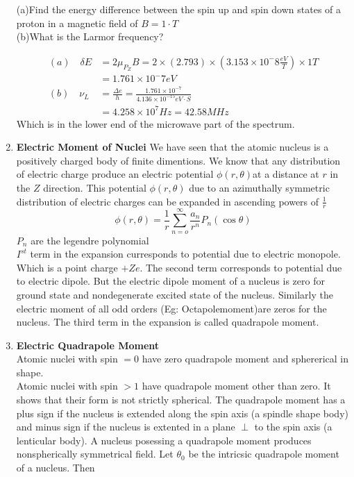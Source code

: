 \begin{enumerate}
\begin{note}
\end{note}
\begin{exercise}
	 (a)\quad Find the energy difference between the spin up and spin down states of a proton in a magnetic field of $B=1\cdot T$ \\
	(b)\quad What is the Larmor frequency?
\end{exercise}
\begin{answer}
	\begin{align*}
	(a)\quad
	\delta E&=2\mu_{P_{Z}}B=2\times(2.793)\times \left(3.153\times10^-8\frac{eV}{T} \right) \times1T\\
	&=1.761\times10^-7 eV\\
	(b)\quad \nu_{L}&=\frac{\Delta e}{h}=\frac{1.761\times10^{-7}}{4.136\times10^{-15}eV\cdot S}\\
	&=4.258\times10^7Hz=42.58MHz
	\end{align*}
	Which is in the lower end of the microwave part of the spectrum.
\end{answer}
\item \textbf{Electric Moment of Nuclei}
We have seen that the atomic nucleus is a positively charged body of finite dimentions. We know that any distribution of electric charge produce an electric potential $\phi(r,\theta)$at a distance at $r$ in the $Z$ direction. This potential $\phi(r,\theta)$ due to an azimuthally symmetric distribution of electric charges can be expanded in ascending powers of $\frac{1}{r}$
$$\phi(r,\theta)=\frac{1}{r}\sum_{n=o}^{\infty}\frac{a_n}{r^n}P_n(\cos\theta)$$
$P_n$ are the legendre polynomial\\
$I^{st}$ term in the expansion curresponds to potential due to electric monopole. Which is a point charge $+Ze$. The second term corresponds to potential due to electric dipole. But the electric dipole moment of a nucleus is zero for ground state and nondegenerate excited state of the nucleus. Similarly the electric moment of all odd orders (Eg: Octapolemoment)are zeros for the nucleus. The third term in the expansion is called quadrapole moment.
\item \textbf{Electric Quadrapole Moment}\\
Atomic nuclei with spin $=0$ have zero quadrapole moment and sphererical in shape. \\
Atomic nuclei with spin $>1$ have quadrapole moment other than zero. It shows that their form is not strictly spherical. The quadrapole moment has a plus sign if the nucleus is  extended along  the spin axis (a spindle shape body) and minus sign if the nucleus is extented in a plane $\perp$ to the spin axis (a lenticular body). A nucleus posessing a quadrapole moment produces nonspherically symmetrical field. Let $\theta_0$ be the intricsic quadrapole moment of a nucleus. Then 

\end{enumerate}
